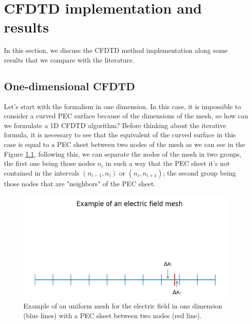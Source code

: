 \documentclass[12pt, oneside]{book}
\begin{document}
\chapter{CFDTD implementation and results}

In this section, we discuss the CFDTD method implementation along some results that we compare with the literature.
\section{One-dimensional CFDTD}
Let's start with the formalism in one dimension. In this case, it is impossible to consider a curved PEC surface because of the dimensions of the mesh, so how can we formulate a 1D CFDTD algorithm? Before thinking about the iterative formula, it is necessary to see that the equivalent of the curved surface in this case is equal to a PEC sheet between two nodes of the mesh as we can see in the Figure \ref{fig:Mesh1D_CFDTD}, following this, we can separate the nodes of the mesh in two groups, the first one being those nodes $n_i$ in such a way that the PEC sheet it's not contained in the intervals $(n_{i-1}, n_i)$ or $(n_i, n_{i+1})$; the second group being those nodes that are "neighbors" of the PEC sheet. 
\begin{figure}[h]
    \centering
    \includegraphics[scale=1.1]{Imagenes/Mesh1D_CFDTD.png}
    \caption{Example of an uniform mesh for the electric field in one dimension (blue lines) with a PEC sheet between two nodes (red line).}
    \label{fig:Mesh1D_CFDTD}
\end{figure}
\end{document}
